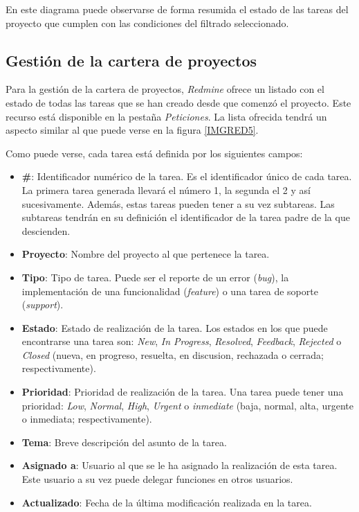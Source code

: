 \documentclass[11pt,a4paper,spanish,twoside]{report}
\begin{document}

	En este diagrama puede observarse de forma resumida el estado de las tareas
	del proyecto que cumplen con las condiciones del filtrado seleccionado.

	\subsection{Gestión de la cartera de proyectos}
	Para la gestión de la cartera de proyectos, \emph{Redmine} ofrece un listado
	con el estado de todas las tareas que se han creado desde que comenzó el
	proyecto. Este recurso está disponible en la pestaña \emph{Peticiones}.
	La lista ofrecida tendrá un aspecto similar al que puede verse en la
	figura \ref{IMGRED5}. 


	Como puede verse, cada tarea está definida por los siguientes campos:
	\begin{itemize}
	\item \textbf{\#}: Identificador numérico de la tarea. Es el identificador
	único de cada tarea. La primera tarea generada llevará el número 1, la
	segunda el 2 y así sucesivamente. Además, estas tareas pueden tener a su
	vez subtareas. Las subtareas tendrán en su definición el identificador de la
	tarea	padre de la que descienden.
	\item \textbf{Proyecto}: Nombre del proyecto al que pertenece la tarea.
	\item \textbf{Tipo}: Tipo de tarea. Puede ser el reporte de un error
	(\emph{bug}),	la implementación de una funcionalidad (\emph{feature}) o una
	tarea de soporte (\emph{support}).
	\item \textbf{Estado}: Estado de realización de la tarea. Los estados en
	los que puede encontrarse una tarea son: \emph{New}, \emph{In Progress},
	\emph{Resolved}, \emph{Feedback}, \emph{Rejected} o \emph{Closed} (nueva,
	en progreso, resuelta, en discusion, rechazada o cerrada; respectivamente).
	\item \textbf{Prioridad}: Prioridad de realización de la tarea. Una tarea
	puede tener una prioridad: \emph{Low}, \emph{Normal}, \emph{High},
	\emph{Urgent} o \emph{inmediate} (baja, normal, alta, urgente o inmediata;
	respectivamente).
	\item \textbf{Tema}: Breve descripción del asunto de la tarea.
	\item \textbf{Asignado a}: Usuario al que se le ha asignado la realización
	de esta tarea. Este usuario a su vez puede delegar funciones en otros
	usuarios.
	\item \textbf{Actualizado}: Fecha de la última modificación realizada en la
	tarea.
	\end{itemize}
\end{document}
